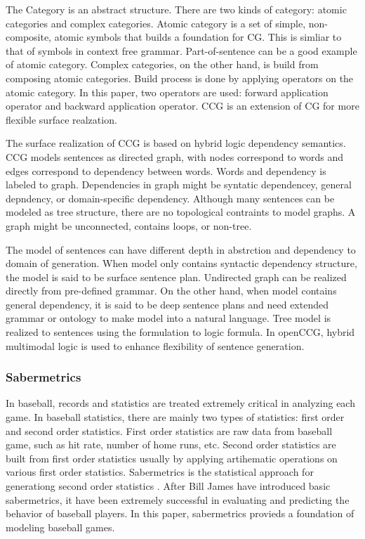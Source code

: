 \documentclass{sig-alternate}
\begin{document}
The Category is an abstract structure. There are two kinds of category: atomic categories and complex categories. Atomic category is a set of simple, non-composite, atomic symbols that builds a foundation for CG. This is simliar to that of symbols in context free grammar. Part-of-sentence can be a good example of atomic category. Complex categories, on the other hand, is build from composing atomic categories. Build process is done by applying operators on the atomic category. In this paper, two operators are used: forward application operator and backward application operator. CCG is an extension of CG for more flexible surface realzation. 

The surface realization of CCG is based on hybrid logic dependency semantics. CCG models sentences as directed graph, with nodes correspond to words and edges correspond to dependency between words. Words and dependency is labeled to graph. Dependencies in graph might be syntatic dependencey, general depndency, or domain-specific dependency. Although many sentences can be modeled as tree structure, there are no topological contraints to model graphs. A graph might be unconnected, contains loops, or non-tree. 

The model of sentences can have different depth in abstrction and dependency to domain of generation. When model only contains syntactic dependency structure, the model is said to be surface sentence plan. Undirected graph can be realized directly from pre-defined grammar. On the other hand, when model contains general dependency, it is said to be deep sentence plans and need extended grammar or ontology to make model into a natural language. Tree model is realized to sentences using the formulation to logic formula. In openCCG, hybrid multimodal logic is used to enhance flexibility of sentence generation. 


\subsubsection{Sabermetrics}

In baseball, records and statistics are treated extremely critical in analyzing each game. In baseball statistics, there are mainly two types of statistics: first order and second order statistics. First order statistics are raw data from baseball game, such as hit rate, number of home runs, etc. Second order statistics are built from first order statistics usually by applying artihematic operations on various first order statistics. Sabermetrics is the statistical approach for generationg second order statistics \cite{billjames}. After Bill James have introduced basic sabermetrics, it have been extremely successful in evaluating and predicting the behavior of baseball players. In this paper, sabermetrics provieds a foundation of modeling baseball games. 
\end{document}
